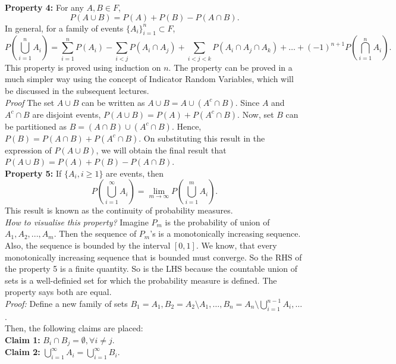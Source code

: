 \textbf{Property 4:} For any \( A, B \in F \),
\[
P(A \cup B) = P(A) + P(B) - P(A \cap B). 
\]
In general, for a family of events \( \{A_i\}_{i=1}^{n} \subset F \),
\[
P\left(\bigcup_{i=1}^{n} A_i\right) = \sum_{i=1}^{n} P(A_i) - \sum_{i < j} P(A_i \cap A_j) + \sum_{i < j < k} P(A_i \cap A_j \cap A_k) + \ldots + (-1)^{n+1} P\left(\bigcap_{i=1}^{n} A_i\right). 
\]
This property is proved using induction on \( n \). The property can be proved in a much simpler way using the concept of Indicator Random Variables, which will be discussed in the subsequent lectures.\\

\textit{Proof} The set \( A \cup B \) can be written as \( A \cup B = A \cup (A^c \cap B) \). Since \( A \) and \( A^c \cap B \) are disjoint events, \( P(A \cup B) = P(A) + P(A^c \cap B) \). Now, set \( B \) can be partitioned as \( B = (A \cap B) \cup (A^c \cap B) \). Hence, \( P(B) = P(A \cap B) + P(A^c \cap B) \). On substituting this result in the expression of \( P(A \cup B) \), we will obtain the final result that \( P(A \cup B) = P(A) + P(B) - P(A \cap B) \).\\

\textbf{Property 5:} If \( \{A_i, i \geq 1\} \) are events, then
\[
P\left(\bigcup_{i=1}^{\infty} A_i\right) = \lim_{m \to \infty} P\left(\bigcup_{i=1}^{m} A_i\right). 
\]
This result is known as the continuity of probability measures.\\

\textit{How to visualise this property?} Imagine $P_m$ is the probability of union of $A_1, A_2, ..., A_m$. Then the sequence of $P_m$'s is a monotonically increasing sequence. Also, the sequence is bounded by the interval $[0, 1]$. We know, that every monotonically increasing sequence that is bounded must converge. So the RHS of the property 5 is a finite quantity. So is the LHS because the countable union of sets is a well-definied set for which the probability measure is defined. The property says both are equal. \\

\textit{Proof:} Define a new family of sets \( B_1 = A_1, B_2 = A_2 \setminus A_1, \ldots, B_n = A_n \setminus \bigcup_{i=1}^{n-1} A_i, \ldots \).  \\

Then, the following claims are placed: \\
\textbf{Claim 1:} \( B_i \cap B_j = \emptyset, \forall i \neq j \).  \\
\textbf{Claim 2:} \( \bigcup_{i=1}^{\infty} A_i = \bigcup_{i=1}^{\infty} B_i \).  \\

